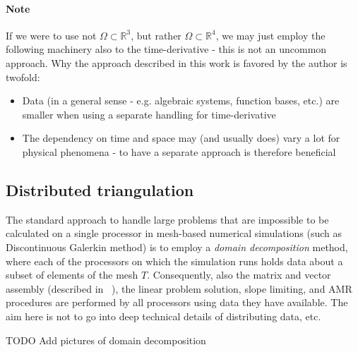 \paragraph{Note}
If we were to use not $\Omega\subset\mathbb{R}^3$, but rather $\Omega\subset\mathbb{R}^4$, we may just employ the following machinery also to the time-derivative - this is not an uncommon approach. Why the approach described in this work is favored by the author is twofold:
\begin{itemize}
    \item Data (in a general sense - e.g. algebraic systems, function bases, etc.) are smaller when using a separate handling for time-derivative
    \item The dependency on time and space may (and usually does) vary a lot for physical phenomena - to have a separate approach is therefore beneficial
\end{itemize}
\subsection{Distributed triangulation}
\label{section:ditributedTria}
The standard approach to handle large problems that are impossible to be calculated on a single processor in mesh-based numerical simulations (such as Discontinuous Galerkin method) is to employ a \textit{domain decomposition} method, where each of the processors on which the simulation runs holds data about a subset of elements of the mesh $T$.
Consequently, also the matrix and vector assembly (described in ~), the linear problem solution, slope limiting, and AMR procedures are performed by all processors using data they have available. The aim here is not to go into deep technical details of distributing data, etc.

TODO Add pictures of domain decomposition